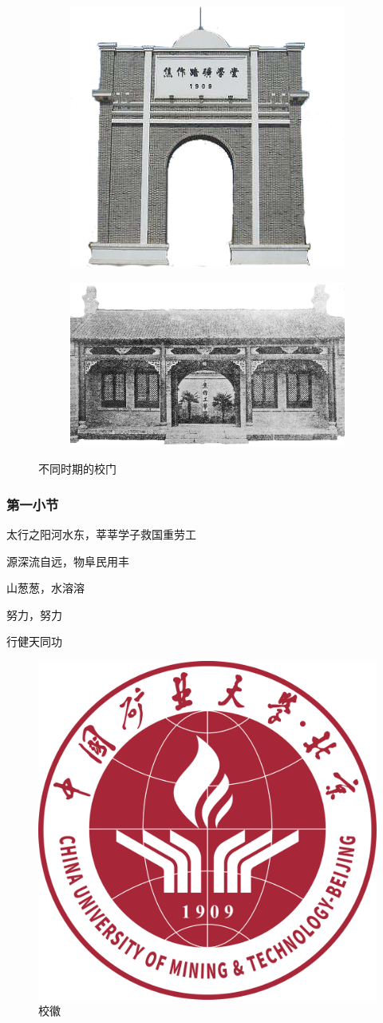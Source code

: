 \documentclass[UTF8,AutoFakeBold=1.3,fixskip = true]{ctexart}
\numberwithin{figure}{section}
\numberwithin{table}{section}
\numberwithin{equation}{section}
\begin{document}
		\begin{figure}[h!]
			\begin{subfigure}[b]{.5\linewidth}
				\centering
				\includegraphics[width=0.5\linewidth]{../pic/lkxt.png}
				\label{fig:1a}
			\end{subfigure}
			\hfill
			\begin{subfigure}[b]{.5\linewidth}
				\centering
				\includegraphics[width=0.7\linewidth]{../pic/jg.png}
				\label{fig:1b}
			\end{subfigure}
			\caption{不同时期的校门}
			\label{fig:gate}
		 \end{figure}
		 

		\subsubsection{第一小节}
		太行之阳河水东，莘莘学子救国重劳工
		\par 源深流自远，物阜民用丰
		\par 山葱葱，水溶溶
		\par 努力，努力
		\par 行健天同功
			\begin{figure}[htbp]
				\centering
				\includegraphics[width=0.3\linewidth]{../pic/badge.png}
				\caption{校徽}
				\label{fig:badge}
			\end{figure}
\end{document}
